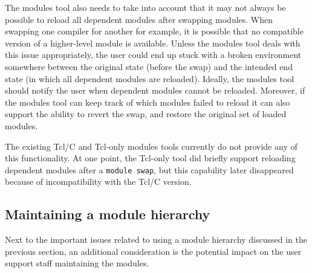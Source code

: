 The modules tool also needs to take into account that it may not always be
possible to reload all dependent modules after swapping modules. When swapping
one compiler for another for example, it is possible that no compatible version of a
higher-level  module is available. Unless the modules tool deals with this issue
appropriately, the user could end up stuck with a broken environment somewhere between
the original state (before the swap) and the intended end state (in which all
dependent modules are reloaded). Ideally, the modules tool should notify the user
when dependent modules cannot be reloaded. Moreover, if the modules tool can keep
track of which modules failed to reload it can also support the ability to revert
the swap, and restore the original set of loaded modules.

The existing Tcl/C and Tcl-only modules tools currently do not provide any of this
functionality. At one point, the Tcl-only tool did briefly support reloading
dependent modules after a \texttt{\small module swap}, but this capability later
disappeared because of incompatibility with the Tcl/C version.




\subsection{Maintaining a module hierarchy}
\label{sec:maintaining_a_hierarchy}

Next to the important issues related to using a module hierarchy discussed in the
previous section, an additional consideration is the potential impact on the user
support staff maintaining the modules.

